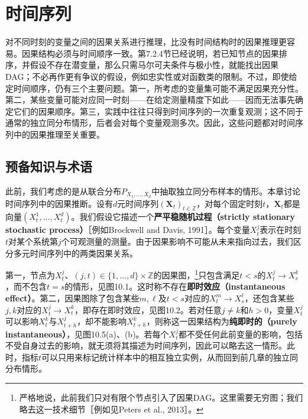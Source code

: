 \chapter{时间序列}
\label{chap:time-series}
\newcommand{\chtennote}[1]{\refstepcounter{chtentransnote}\begin{quote}\begin{minipage}{\linewidth}\small\textbf{译注\arabic{chtentransnote}：}#1\end{minipage}\end{quote}}

对不同时刻的变量之间的因果关系进行推理，比没有时间结构时的因果推理更容易。因果结构必须与时间顺序一致。第7.2.4节已经说明，若已知节点的因果排序，并假设不存在潜变量，那么只需马尔可夫条件与极小性，就能找出因果DAG；不必再作更有争议的假设，例如忠实性或对函数类的限制。不过，即使给定时间顺序，仍有三个主要问题。第一，所考虑的变量集可能不满足因果充分性。第二，某些变量可能对应同一时刻——在给定测量精度下如此——因而无法事先确定它们的因果顺序。第三，实践中往往只得到时间序列的一次重复观测；这不同于通常的独立同分布情形，后者会对每个变量观测多次。因此，这些问题都对时间序列中的因果推理至关重要。

\section{预备知识与术语}
此前，我们考虑的是从联合分布$P_{X_1,\ldots,X_d}$中抽取独立同分布样本的情形。本章讨论时间序列中的因果推断。设有$d$元时间序列$(\mathbf X_t)_{t\in\mathbb Z}$，对每个固定时刻$t$，$\mathbf X_t$都是向量$(X_t^1,\ldots,X_t^d)$。我们假设它描述一个\textbf{严平稳随机过程（strictly stationary stochastic process）}［例如Brockwell and Davis, 1991］。每个变量$X_t^j$表示在时刻$t$对某个系统第$j$个可观测量的测量。由于因果影响不可能从未来指向过去，我们区分多元时间序列中的两类因果关系。

第一，节点为$X_t^j$、$(j,t)\in\{1,\ldots,d\}\times\mathbb Z$的因果图，\footnote{严格地说，此前我们只对有限个节点引入了因果DAG。这里需要无穷图；我们略去这一技术细节［例如见Peters et al., 2013］。}只包含满足$t<s$的$X_t^j\to X_s^k$，而不包含$t=s$的情形，见图10.1。这时称不存在\textbf{即时效应（instantaneous effect）}。第二，因果图除了包含某些$m,\ell$及$t<s$对应的$X_t^m\to X_s^\ell$，还包含某些$j,k$对应的$X_t^j\to X_t^k$，即存在即时效应，见图10.2。若对任意$j\ne k$和$h>0$，变量$X_t^j$可以影响$X_t^k$与$X_{t+h}^j$，却不能影响$X_{t+h}^k$，则称这一因果结构为\textbf{纯即时的（purely instantaneous）}，见图10.5(a)、(b)。若每个$X_t^j$都不受任何此前变量的影响，包括不受自身过去的影响，就无须将其描述为时间序列，因此可以略去这一情形。此时，指标$t$可以只用来标记统计样本中的相互独立实例，从而回到前几章的独立同分布情形。

